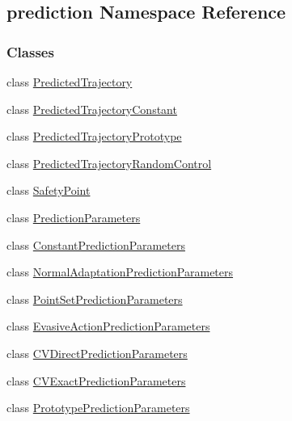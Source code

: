 \hypertarget{namespaceprediction}{\subsection{prediction Namespace Reference}
\label{namespaceprediction}
}
\subsubsection*{Classes}
\begin{DoxyCompactItemize}
\item 
class \hyperlink{classprediction_1_1PredictedTrajectory}{Predicted\-Trajectory}
\item 
class \hyperlink{classprediction_1_1PredictedTrajectoryConstant}{Predicted\-Trajectory\-Constant}
\item 
class \hyperlink{classprediction_1_1PredictedTrajectoryPrototype}{Predicted\-Trajectory\-Prototype}
\item 
class \hyperlink{classprediction_1_1PredictedTrajectoryRandomControl}{Predicted\-Trajectory\-Random\-Control}
\item 
class \hyperlink{classprediction_1_1SafetyPoint}{Safety\-Point}
\item 
class \hyperlink{classprediction_1_1PredictionParameters}{Prediction\-Parameters}
\item 
class \hyperlink{classprediction_1_1ConstantPredictionParameters}{Constant\-Prediction\-Parameters}
\item 
class \hyperlink{classprediction_1_1NormalAdaptationPredictionParameters}{Normal\-Adaptation\-Prediction\-Parameters}
\item 
class \hyperlink{classprediction_1_1PointSetPredictionParameters}{Point\-Set\-Prediction\-Parameters}
\item 
class \hyperlink{classprediction_1_1EvasiveActionPredictionParameters}{Evasive\-Action\-Prediction\-Parameters}
\item 
class \hyperlink{classprediction_1_1CVDirectPredictionParameters}{C\-V\-Direct\-Prediction\-Parameters}
\item 
class \hyperlink{classprediction_1_1CVExactPredictionParameters}{C\-V\-Exact\-Prediction\-Parameters}
\item 
class \hyperlink{classprediction_1_1PrototypePredictionParameters}{Prototype\-Prediction\-Parameters}
\end{DoxyCompactItemize}
